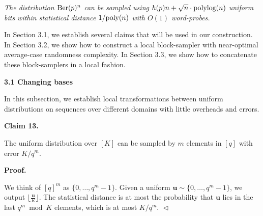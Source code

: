 \documentclass[10pt,a4paper]{article}
\begin{document}
\emph{The distribution $\textnormal{Ber}(p)^{n}$ can be sampled using $h(p)n+\sqrt{n}\cdot\textnormal{polylog}(n)$ uniform bits within statistical distance $1/\textnormal{poly}(n)$ with $O(1)$ word-probes.}\par







In Section 3.1, we establish several claims that will be used in our construction.
In Section 3.2, we show how to construct a local block-sampler with near-optimal average-case randomness complexity.
In Section 3.3, we show how to concatenate these block-samplers in a local fashion.\par




\par\medskip\noindent\textbf{
3.1 Changing bases}\par




In this subsection, we establish local transformations between uniform distributions on sequences over different domains with little overheads and errors.\par





\par\medskip\noindent\textbf{
Claim 13. 
}\par



The uniform distribution over $[K]$ can be sampled by $m$ elements in $[q]$ with error $K/q^{m}$.\par






\par\medskip\noindent\textbf{
\textbf{Proof}.}\par




We think of $[q]^{m}$ as $\{0,\ldots,q^{m}-1\}$.
Given a uniform $\boldsymbol{u}\sim\{0,\ldots,q^{m}-1\}$, we output $\lfloor\frac{\boldsymbol{u}}{K}\rfloor$.
The statistical distance is at most the probability that $\boldsymbol{u}$ lies in the last $q^{m}\bmod K$ elements, which is at most $K/q^{m}$.
$\vartriangleleft$\par
\end{document}

